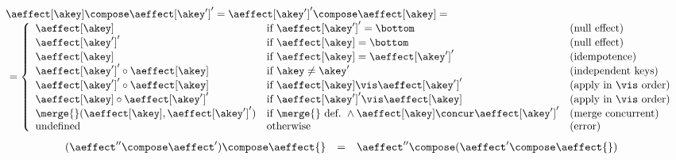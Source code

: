 %
\[
\begin{array}{l}
    \aeffect[\akey] \compose \aeffect[\akey']' = \aeffect[\akey']' \compose \aeffect[\akey] = \\
      \ = \left\{
        \begin{array}{lll}
          \aeffect[\akey]    & \text{if}\ \aeffect[\akey']' = \bottom 		&  \text{(null effect)} \\
          \aeffect[\akey']'  & \text{if}\ \aeffect[\akey] = \bottom 		&  \text{(null effect)} \\
          \aeffect[\akey]    & \text{if}\ \aeffect[\akey] = \aeffect[\akey']' 	& \text{(idempotence)} \\
          \aeffect[\akey']' \circ \aeffect[\akey]
                             & \text{if}\ \akey \neq \akey' 			& \text{(independent keys)} \\

          \aeffect[\akey']' \circ \aeffect[\akey]
                             & \text{if}\ \aeffect[\akey] \vis \aeffect[\akey']' & \text{(apply in } \vis \text{ order)} \\
          \aeffect[\akey] \circ \aeffect[\akey']'
                             & \text{if}\ \aeffect[\akey']' \vis \aeffect[\akey] & \text{(apply in } \vis \text{ order)} \\
          \merge{}(\aeffect[\akey],\aeffect[\akey']')
                             & \text{if \merge{} def.}\
                               \land \aeffect[\akey] \concur \aeffect[\akey']'  & \text{(merge concurrent)} \\
          \text{undefined}   & \text{otherwise}                                 & \text{(error)} \\

        \end{array}
        \right.
\end{array}
\]
\[
  \begin{array}[t]{rcl}
    (\aeffect'' \compose \aeffect') \compose \aeffect{}
    & = & \aeffect'' \compose (\aeffect' \compose \aeffect{}) \\
  \end{array}
\]

